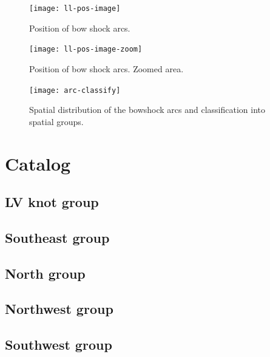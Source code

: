 \documentclass[iop, apj]{emulateapj}
\begin{document}
\begin{figure}
  \texttt{[image: ll-pos-image]}
  \caption{Position of bow shock arcs.}
  \label{fig:pos-image}
\end{figure}

\begin{figure}
  \texttt{[image: ll-pos-image-zoom]}
  \caption{Position of bow shock arcs. Zoomed area.}
  \label{fig:pos-image}
\end{figure}

\begin{figure}
  \centering
  \texttt{[image: arc-classify]}
  \caption{Spatial distribution of the bowshock arcs and classification into spatial groups.}
  \label{fig:size-v-distance}
\end{figure}

\section{Catalog}
\label{sec:catalog}

\subsection{LV knot group}
\label{sec:lv-group}



\clearpage
\subsection{Southeast group}
\label{sec:se-group}



\clearpage
\subsection{North group}
\label{sec:n-group}



\clearpage
\subsection{Northwest group}
\label{sec:nw-group}



\clearpage
\subsection{Southwest group}
\label{sec:sw-group}


\end{document}
